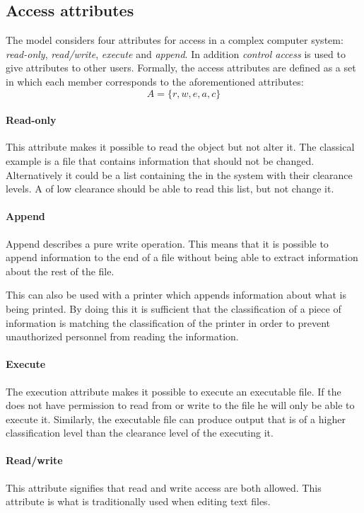 \subsection{Access attributes}\label{blp:access_attributes}
The model considers four attributes for access in a complex computer system: \emph{read-only}, \emph{read/write}, \emph{execute} and \emph{append}.
In addition \emph{control access} is used to give attributes to other users.
Formally, the access attributes are defined as a set in which each member corresponds to the aforementioned attributes:
$$A = \{ r, w, e, a, c \}$$

\paragraph{Read-only}
This attribute makes it possible to read the object but not alter it.
The classical example is a file that contains information that should not be changed.
Alternatively it could be a list containing the \principals{} in the system with their clearance levels.
A \principal{} of low clearance should be able to read this list, but not change it.

\paragraph{Append}
Append describes a pure write operation.
This means that it is possible to append information to the end of a file without being able to extract information about the rest of the file.

This can also be used with a printer which appends information about what is being printed.
By doing this it is sufficient that the classification of a piece of information is matching the classification of the printer in order to prevent unauthorized personnel from reading the information.

\paragraph{Execute}
The execution attribute makes it possible to execute an executable file.
If the \principal{} does not have permission to read from or write to the file he will only be able to execute it.
Similarly, the executable file can produce output that is of a higher classification level than the clearance level of the \principal{} executing it.

\paragraph{Read/write}
This attribute signifies that read and write access are both allowed.
This attribute is what is traditionally used when editing text files.

